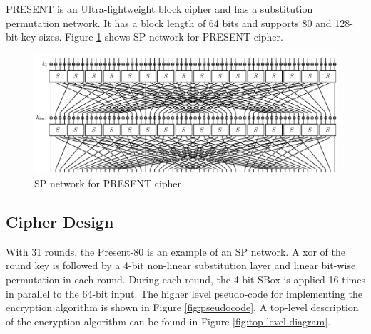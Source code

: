 \documentclass[preprint]{transcrypto}
\begin{document}
PRESENT\cite{present} is an Ultra-lightweight block cipher and has a substitution permutation network. It has a block length of 64 bits and supports 80 and 128-bit key sizes. Figure \ref{fig:spp} shows SP network for PRESENT cipher.

\begin{figure}[h!]
    \centering
    \includegraphics[width=\linewidth]{present/PRESENT_diagram.pdf}
    \caption{SP network for PRESENT cipher \cite{presentdiagram}}
    \label{fig:spp}
\end{figure}

\subsection{Cipher Design}
With 31 rounds, the Present-80 is an example of an SP network. A xor of the round key is followed by a 4-bit non-linear substitution layer and linear bit-wise permutation in each round. During each round, the 4-bit SBox is applied 16 times in parallel to the 64-bit input. The higher level pseudo-code for implementing the encryption algorithm is shown in Figure \ref{fig:pseudocode}. A top-level description of the encryption algorithm can be found in Figure \ref{fig:top-level-diagram}.

\end{document}
